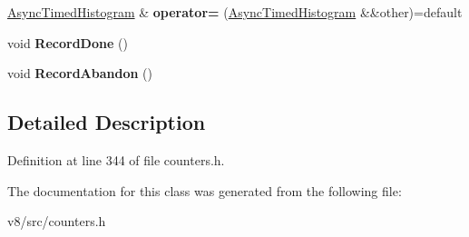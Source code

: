 \begin{DoxyCompactItemize}
\mbox{\hyperlink{classv8_1_1internal_1_1AsyncTimedHistogram}{Async\+Timed\+Histogram}} \& {\bfseries operator=} (\mbox{\hyperlink{classv8_1_1internal_1_1AsyncTimedHistogram}{Async\+Timed\+Histogram}} \&\&other)=default
\item 
\mbox{\label{classv8_1_1internal_1_1AsyncTimedHistogram_a981b25f3a3b60c81add2013ce94a846f}} 
void {\bfseries Record\+Done} ()
\item 
\mbox{\label{classv8_1_1internal_1_1AsyncTimedHistogram_a4d3238009618e05cfb985251f43105c0}} 
void {\bfseries Record\+Abandon} ()
\end{DoxyCompactItemize}


\subsection{Detailed Description}


Definition at line 344 of file counters.\+h.



The documentation for this class was generated from the following file\+:\begin{DoxyCompactItemize}
\item 
v8/src/counters.\+h\end{DoxyCompactItemize}
